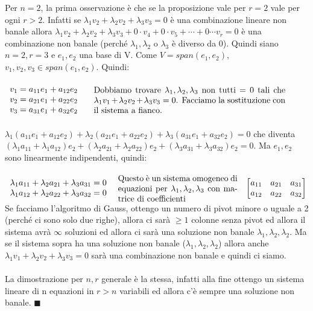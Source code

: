 \begin{demostration}
Per $n=2$, la prima osservazione è che se la proposizione vale per $r =2$ vale per ogni $r > 2$. Infatti se $\lambda_1v_2 + \lambda_2v_2 + \lambda_3v_3 = 0$ è una combinazione lineare non banale allora $\lambda_1v_2 + \lambda_2v_2 + \lambda_3v_3 + 0 \cdot v_4 + 0 \cdot v_5 + \cdots + 0 \cdots v_r = 0$ è una combinazione non banale (perché $\lambda_1, \lambda_2$ o $\lambda_3$ è diverso da 0). Quindi siano $n=2, r=3$ e $e_1, e_2$ una base di V. Come $V=span(e_1,e_2)$, $v_1, v_2, v_3 \in span(e_1, e_2)$. Quindi:\\\\
$\begin{array}{l}
v_1 = a_{11}e_1 + a_{12}e_2\\
v_2 = a_{21}e_1 + a_{22}e_2\\
v_3 = a_{31}e_1 + a_{32}e_2
\end{array}
\hspace{.5cm}
\parbox{8cm}{Dobbiamo trovare $\lambda_1, \lambda_2, \lambda_3$ non tutti $=0$ tali che $\lambda_1v_1 + \lambda_2v_2 + \lambda_3v_3 = 0$. Facciamo la sostituzione con il sistema a fianco.}$\\\\
$\lambda_1(a_{11}e_1 + a_{12}e_2) + \lambda_2(a_{21}e_1+a_{22}e_2) + \lambda_3(a_{31}e_1 + a_{32}e_2) = 0$ che diventa $(\lambda_1a_{11} + \lambda_1a_{12})e_2 + (\lambda_2a_{21} + \lambda_2a_{22})e_2 + (\lambda_3a_{31} + \lambda_3a_{32})e_2 = 0$. Ma $e_1, e_2$ sono linearmente indipendenti, quindi:\\\\
$\begin{array}{l}
\lambda_1a_{11} + \lambda_2a_{21} + \lambda_3 a_{31} = 0\\
\lambda_1a_{12} + \lambda_2a_{22} + \lambda_3 a_{32} = 0
\end{array}
\hspace{.3cm}
\parbox{5cm}{Questo è un sistema omogeneo di equazioni per $\lambda_1, \lambda_2, \lambda_3$ con matrice di coefficienti}\hspace{.3cm}
\begin{bmatrix}
a_{11}&a_{21}&a_{31}\\
a_{12}&a_{22}&a_{32}
\end{bmatrix}$\\
Se facciamo l'algoritmo di Gauss, ottengo un numero di pivot minore o uguale a 2 (perché ci sono solo due righe), allora ci sarà $\geq 1$ colonne senza pivot ed allora il sistema avrà $\infty$ soluzioni ed allora ci sarà una soluzione non banale $\lambda_1, \lambda_2, \lambda_2$. Ma se il sistema sopra ha una soluzione non banale ($\lambda_1, \lambda_2, \lambda_2$) allora anche $\lambda_1v_1 + \lambda_2 v_2 + \lambda_3 v_3 = 0$ sarà una combinazione non banale e quindi ci siamo.\\\\
La dimostrazione per $n,r$ generale è la stessa, infatti alla fine ottengo un sistema lineare di n equazioni in $r > n$ variabili ed allora c'è sempre una soluzione non banale. $\blacksquare$
\end{demostration}

